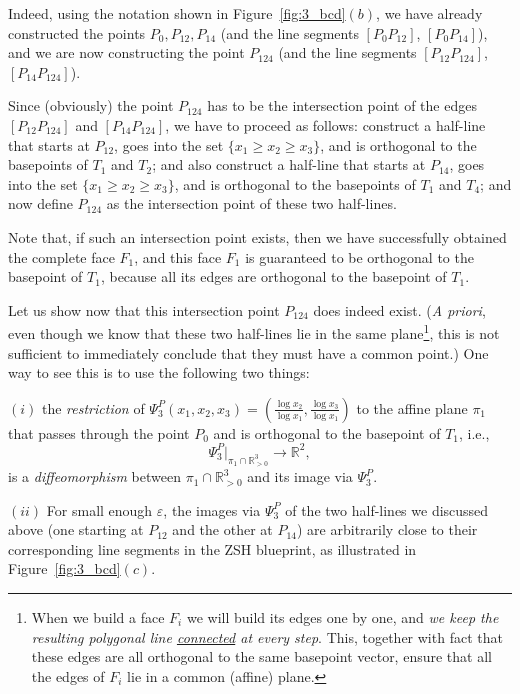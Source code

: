 \documentclass[12pt,letterpaper]{article}
\begin{document}
 
Indeed, using the notation shown in Figure~\ref{fig:3_bcd}$(b)$, we have already constructed the points $P_0, P_{12}, P_{14}$ (and the line segments $[P_{0}P_{12}]$, $[P_{0}P_{14}]$), and we are now constructing the point $P_{124}$ (and the line segments $[P_{12}P_{124}]$, $[P_{14}P_{124}]$). 

Since (obviously) the point $P_{124}$ has to be the intersection point of the edges $[P_{12}P_{124}]$ and $[P_{14}P_{124}]$, we have to proceed as follows:  construct a half-line that starts at $P_{12}$, goes into the set $\{x_1 \ge x_2 \ge x_3\}$, and is orthogonal to the basepoints of $T_1$ and $T_2$; and also construct a half-line that starts at $P_{14}$, goes into the set $\{x_1 \ge x_2 \ge x_3\}$,  and is orthogonal to the basepoints of $T_1$ and $T_4$; and now define $P_{124}$ as the intersection point of these two half-lines. 

Note that, if such an intersection point exists, then we have successfully obtained the complete face $F_1$, and  this face $F_1$ is guaranteed to be orthogonal to the basepoint of $T_1$, because all its edges are orthogonal to the basepoint of $T_1$. 

Let us show now that this intersection point $P_{124}$ does indeed exist. ({\em A priori}, even though we know that these two half-lines lie in the same plane\footnote{When we build a face $F_i$ we will build its edges one by one, and {\em we keep the resulting polygonal line \underline{connected} at every step}. This, together with fact that these edges are all orthogonal to the same basepoint vector, ensure that all the edges of $F_i$ lie in a common (affine) plane.}, this is not sufficient to immediately conclude that they must have a common point.) One way to see this is to use the following two things:

\smallskip

$(i)$ the {\em restriction} of $\Psi_3^P(x_1, x_2, x_3) = \left( \frac{\log x_2}{\log x_1}, \frac{\log x_3}{\log x_1} \right)$ to the affine plane $\pi_1$ that passes through the point $P_0$ and is orthogonal to the basepoint of $T_1$, i.e., 
$$
{\Psi_3^P \Big |}_{\pi_1 \cap \mathbb{R}^3_{>0}} \to \mathbb{R}^2,
$$
is a {\em diffeomorphism} between $\pi_1 \cap \mathbb{R}^3_{>0}$ and its image via $\Psi_3^P$.

\smallskip

$(ii)$ For small enough $\varepsilon$, the images via $\Psi_3^P$ of the two half-lines we discussed above (one starting at $P_{12}$ and the other at $P_{14}$) are arbitrarily close to their corresponding line segments in the ZSH blueprint, as illustrated in Figure~\ref{fig:3_bcd}$(c)$.
\end{document}
